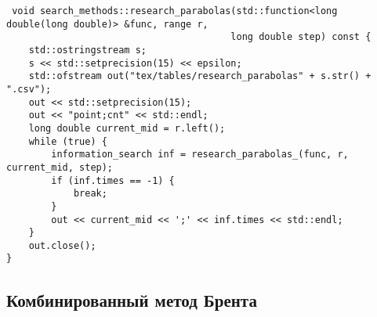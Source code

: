 \begin{lstlisting}
 void search_methods::research_parabolas(std::function<long double(long double)> &func, range r,
                                        long double step) const {
    std::ostringstream s;
    s << std::setprecision(15) << epsilon;
    std::ofstream out("tex/tables/research_parabolas" + s.str() + ".csv");
    out << std::setprecision(15);
    out << "point;cnt" << std::endl;
    long double current_mid = r.left();
    while (true) {
        information_search inf = research_parabolas_(func, r, current_mid, step);
        if (inf.times == -1) {
            break;
        }
        out << current_mid << ';' << inf.times << std::endl;
    }
    out.close();
}
\end{lstlisting}
\newpage
\subsection{Комбинированный метод Брента}
